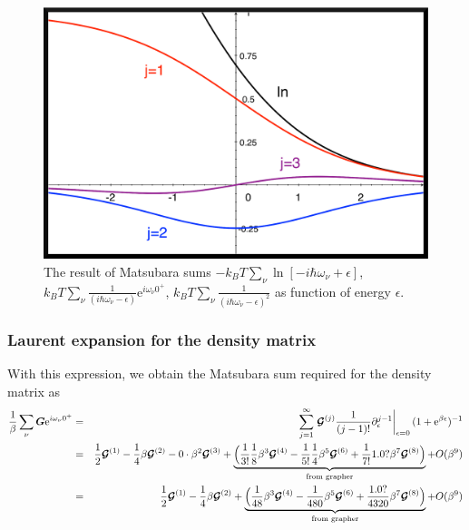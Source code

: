 \documentclass[11pt,a4paper]{report}
\newcommand{\e}[1]{\mathrm{e}^{#1}}%
\newcommand{\mat}[1]{\bm{#1}}  %
\begin{document}
\begin{figure}[h!]
\begin{center}
\includegraphics[width=0.5\linewidth,clip=true]
{Figs/Matsubarasums/matsubarasums1.eps}
\end{center}
\caption{\label{fig:matsubarasums} The result of Matsubara sums
  $-k_BT\sum_\nu\ln[-i\hbar\omega_\nu+\epsilon]$, $k_BT\sum_\nu
  \frac{1}{(i\hbar\omega_\nu-\epsilon)}\e{i\omega_\nu 0^+}$,
$k_BT\sum_\nu \frac{1}{(i\hbar\omega_\nu-\epsilon)^2}$ as
  function of energy $\epsilon$.}
\end{figure}

\subsubsection{Laurent expansion for the density matrix}
With this expression, we obtain the Matsubara sum required for the
density matrix as
\begin{eqnarray*}
\frac{1}{\beta}\sum_\nu\mat{G}\e{i\omega_\nu0^+}
&=&\sum_{j=1}^\infty
\left.\mat{\mathcal{G}}^{(j)}\frac{1}{(j-1)!}
\partial^{j-1}_\epsilon\right|_{\epsilon=0}(1+\e{\beta\epsilon})^{-1}
\nonumber\\
&=&
\frac{1}{2}\mat{\mathcal{G}}^{(1)}
-\frac{1}{4}\beta\mat{\mathcal{G}}^{(2)}
-0\cdot\beta^2\mat{\mathcal{G}}^{(3)}
+\underbrace{\Bigl(
\frac{1}{3!}\frac{1}{8}\beta^3\mat{\mathcal{G}}^{(4)}
-\frac{1}{5!}\frac{1}{4}\beta^5\mat{\mathcal{G}}^{(6)}
+\frac{1}{7!}1.0?\beta^7\mat{\mathcal{G}}^{(8)}\Bigr)
}_{\text{from grapher}}
+O(\beta^9)
\nonumber\\
&=&
\frac{1}{2}\mat{\mathcal{G}}^{(1)}
-\frac{1}{4}\beta\mat{\mathcal{G}}^{(2)}
+\underbrace{\Bigl(
\frac{1}{48}\beta^3\mat{\mathcal{G}}^{(4)}
-\frac{1}{480}\beta^5\mat{\mathcal{G}}^{(6)}
+\frac{1.0?}{4320}\beta^7\mat{\mathcal{G}}^{(8)}\Bigr)}_{\text{from grapher}}
+O(\beta^9)
\end{eqnarray*}



\end{document}
